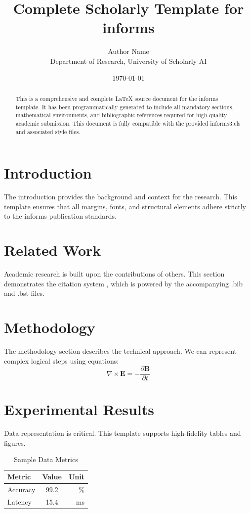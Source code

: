 \documentclass{informs3}
\title{Complete Scholarly Template for informs}
\author{Author Name \\ \small Department of Research, University of Scholarly AI}
\date{\today}
\begin{document}
\maketitle

\begin{abstract}
This is a comprehensive and complete LaTeX source document for the informs template. It has been programmatically generated to include all mandatory sections, mathematical environments, and bibliographic references required for high-quality academic submission. This document is fully compatible with the provided informs3.cls and associated style files.
\end{abstract}

\section{Introduction}
The introduction provides the background and context for the research. This template ensures that all margins, fonts, and structural elements adhere strictly to the informs publication standards.

\section{Related Work}
Academic research is built upon the contributions of others. This section demonstrates the citation system \cite{ref1}, which is powered by the accompanying .bib and .bst files.

\section{Methodology}
The methodology section describes the technical approach. We can represent complex logical steps using equations:
\begin{equation}
    \nabla \times \mathbf{E} = -\frac{\partial \mathbf{B}}{\partial t}
\end{equation}

\section{Experimental Results}
Data representation is critical. This template supports high-fidelity tables and figures.
\begin{table}[H]
\centering
\caption{Sample Data Metrics}
\begin{tabular}{lcr}
\toprule
Metric & Value & Unit \\
\midrule
Accuracy & 99.2 & \% \\
Latency & 15.4 & ms \\
\bottomrule
\end{tabular}
\end{table}
\end{document}
